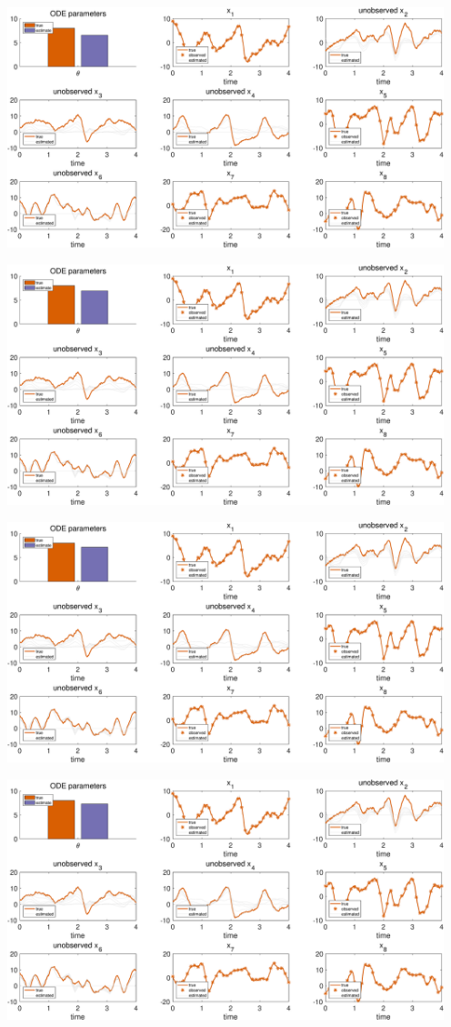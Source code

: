 {\includegraphics [width=5in]{Lorenz96_2_09.eps}

\includegraphics [width=5in]{Lorenz96_2_10.eps}

\includegraphics [width=5in]{Lorenz96_2_11.eps}

\includegraphics [width=5in]{Lorenz96_2_12.eps}

}
